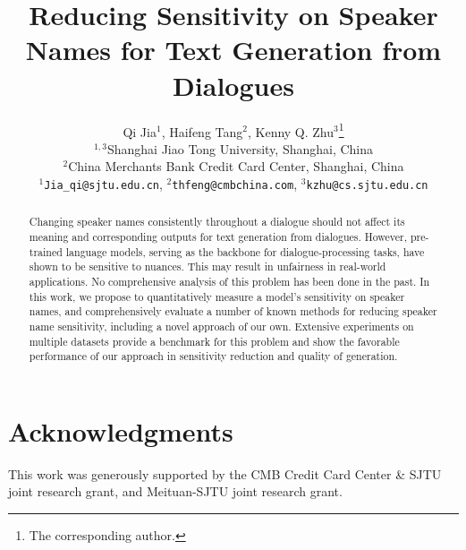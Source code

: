 \documentclass[11pt]{article}
\title{Reducing Sensitivity on Speaker Names for Text Generation from Dialogues}
\author{Qi Jia$^1$, Haifeng Tang$^2$, Kenny Q. Zhu$^3$\thanks{\hspace{2mm}The corresponding author.}\\
	$^{1,3}$Shanghai Jiao Tong University, Shanghai, China \\
	$^2$China Merchants Bank Credit Card Center, Shanghai, China \\
	\texttt{$^1$Jia\_qi@sjtu.edu.cn}, 
	\texttt{$^2$thfeng@cmbchina.com}, 
	\texttt{$^3$kzhu@cs.sjtu.edu.cn}\\
}
\begin{document}
\maketitle
\begin{abstract}
Changing speaker names consistently throughout a dialogue should not 
affect its meaning and corresponding outputs for text generation from dialogues. 
However, pre-trained language models, serving as
the backbone for dialogue-processing tasks, have shown to be sensitive to 
nuances. This may result in unfairness
in real-world applications. 
No comprehensive analysis of this problem has been done in the past.
In this work, we propose to quantitatively measure a model's sensitivity 
on speaker names, and comprehensively evaluate a number of known methods for reducing speaker name sensitivity,
including a novel approach of our own. 
Extensive experiments on multiple datasets provide a benchmark for 
this problem and show the favorable performance of our approach in 
sensitivity reduction and quality of generation.  
\end{abstract}









\section*{Acknowledgments}
This work was generously supported by the CMB Credit Card Center \& SJTU
joint research grant, and Meituan-SJTU joint research grant.







\end{document}
